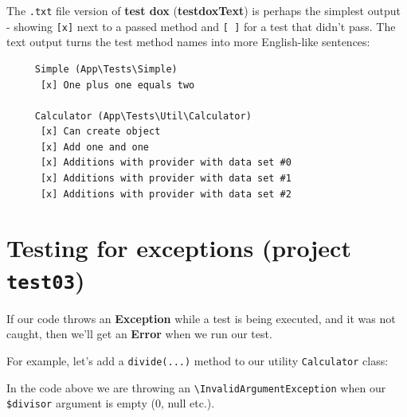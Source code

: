 \documentclass[a4paperpaper,openright]{book}
\newenvironment{Shaded}{}{}
\newcommand{\KeywordTok}[1]{\textcolor[rgb]{0.00,0.44,0.13}{\textbf{#1}}}
\newcommand{\NormalTok}[1]{#1}
\newcommand{\OtherTok}[1]{\textcolor[rgb]{0.00,0.44,0.13}{#1}}
\newcommand{\StringTok}[1]{\textcolor[rgb]{0.25,0.44,0.63}{#1}}
\begin{document}
The \texttt{.txt} file version of \textbf{test dox}
(\textbf{testdoxText}) is perhaps the simplest output - showing
\texttt{{[}x{]}} next to a passed method and \texttt{{[}\ {]}} for a
test that didn't pass. The text output turns the test method names into
more English-like sentences:

\begin{verbatim}
     Simple (App\Tests\Simple)
      [x] One plus one equals two

     Calculator (App\Tests\Util\Calculator)
      [x] Can create object
      [x] Add one and one
      [x] Additions with provider with data set #0
      [x] Additions with provider with data set #1
      [x] Additions with provider with data set #2
\end{verbatim}

\hypertarget{testing-for-exceptions-project-test03}{%
\section{\texorpdfstring{Testing for exceptions (project
\texttt{test03})}{Testing for exceptions (project test03)}}\label{testing-for-exceptions-project-test03}}

If our code throws an \textbf{Exception} while a test is being executed,
and it was not caught, then we'll get an \textbf{Error} when we run our
test.

For example, let's add a \texttt{divide(...)} method to our utility
\texttt{Calculator} class:

\begin{Shaded}
\end{Shaded}

In the code above we are throwing an
\texttt{\textbackslash{}InvalidArgumentException} when our
\texttt{\$divisor} argument is empty (0, null etc.).
\end{document}
